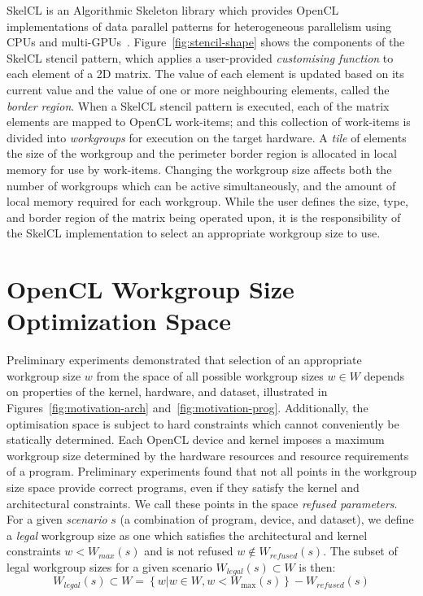\documentclass[times, 10pt,twocolumn]{article}
\begin{document}
SkelCL is an Algorithmic Skeleton library which provides OpenCL
implementations of data parallel patterns for heterogeneous
parallelism using CPUs and
multi-GPUs~\cite{Steuwer2011}. Figure~\ref{fig:stencil-shape} shows
the components of the SkelCL stencil pattern, which applies a
user-provided \emph{customising function} to each element of a 2D
matrix. The value of each element is updated based on its current
value and the value of one or more neighbouring elements, called the
\emph{border region}. When a SkelCL stencil pattern is executed, each
of the matrix elements are mapped to OpenCL work-items; and this
collection of work-items is divided into \emph{workgroups} for
execution on the target hardware. A \emph{tile} of elements the size
of the workgroup and the perimeter border region is allocated in local
memory for use by work-items. Changing the workgroup size affects both
the number of workgroups which can be active simultaneously, and the
amount of local memory required for each workgroup. While the user
defines the size, type, and border region of the matrix being operated
upon, it is the responsibility of the SkelCL implementation to select
an appropriate workgroup size to use.

\section{OpenCL Workgroup Size Optimization Space}

Preliminary experiments demonstrated that selection of an appropriate
workgroup size $w$ from the space of all possible workgroup sizes
$w \in W$ depends on properties of the kernel, hardware, and dataset,
illustrated in Figures~\ref{fig:motivation-arch}
and~\ref{fig:motivation-prog}. Additionally, the optimisation space is
subject to hard constraints which cannot conveniently be statically
determined. Each OpenCL device and kernel imposes a maximum workgroup
size determined by the hardware resources and resource requirements of
a program. Preliminary experiments found that not all points in the
workgroup size space provide correct programs, even if they satisfy
the kernel and architectural constraints. We call these points in the
space \emph{refused parameters}. For a given \emph{scenario} $s$ (a
combination of program, device, and dataset), we define a
\textit{legal} workgroup size as one which satisfies the architectural
and kernel constraints $w < W_{max}(s)$ and is not refused
$w \notin W_{refused}(s)$. The subset of legal workgroup sizes for a
given scenario $W_{legal}(s) \subset W$ is then:
%
\begin{equation}
  W_{legal}(s) \subset W = \left\{w | w \in W, w < W_{\max}(s) \right\} - W_{refused}(s)
\end{equation}
\end{document}
